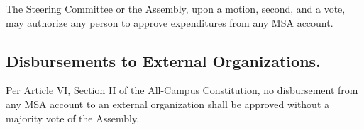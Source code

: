 \subsubsection{}
The Steering Committee or the Assembly, upon a motion, second, and a vote, may authorize any person to approve expenditures from any MSA account.

\subsection{Disbursements to External Organizations.}
Per Article VI, Section H of the All-Campus Constitution, no disbursement from any MSA account to an external organization shall be approved without a majority vote of the Assembly. 

